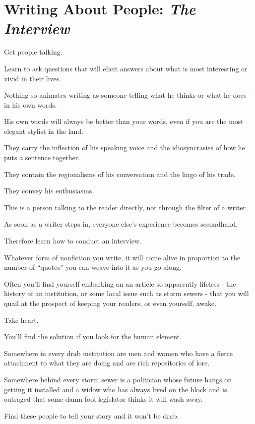 \documentclass{book}
\numberwithin{equation}{section}
\begin{document}

\chapter{Writing About People: \textit{The Interview}}
Get people talking.

Learn to ask questions that will elicit answers about what is most interesting or vivid in their lives.

Nothing so animates writing as someone telling what he thinks or what he does - in his own words.

%
His own words will always be better than your words, even if you are the most elegant stylist in the land.

They carry the inflection of his speaking voice and the idiosyncrasies of how he puts a sentence together.

They contain the regionalisms of his conversation and the lingo of his trade.

They convey his enthusiasms.

This is a person talking to the reader directly, not through the filter of a writer.

As soon as a writer steps in, everyone else's experience becomes secondhand.

Therefore learn how to conduct an interview.

Whatever form of nonfiction you write, it will come alive in proportion to the number of ``quotes'' you can weave into it as you go along.

Often you'll find yourself embarking on an article so apparently lifeless - the history of an institution, or some local issue such as storm sewers - that you will quail at the prospect of keeping your readers, or even yourself, awake.

%
Take heart.

You'll find the solution if you look for the human element.

Somewhere in every drab institution are men and women who have a fierce attachment to what they are doing and are rich repositories of lore.

Somewhere behind every storm sewer is a politician whose future hangs on getting it installed and a widow who has always lived on the block and is outraged that some damn-fool legislator thinks it will wash away.

Find these people to tell your story and it won't be drab.
\end{document}
